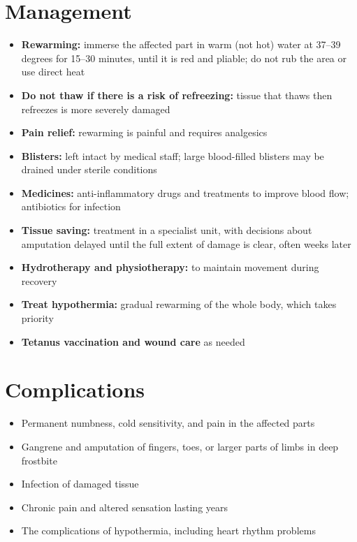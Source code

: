 \section*{Management}
\begin{itemize}
    \item \textbf{Rewarming:} immerse the affected part in warm (not hot) water at 37--39 degrees for 15--30 minutes, until it is red and pliable; do not rub the area or use direct heat
    \item \textbf{Do not thaw if there is a risk of refreezing:} tissue that thaws then refreezes is more severely damaged
    \item \textbf{Pain relief:} rewarming is painful and requires analgesics
    \item \textbf{Blisters:} left intact by medical staff; large blood-filled blisters may be drained under sterile conditions
    \item \textbf{Medicines:} anti-inflammatory drugs and treatments to improve blood flow; antibiotics for infection
    \item \textbf{Tissue saving:} treatment in a specialist unit, with decisions about amputation delayed until the full extent of damage is clear, often weeks later
    \item \textbf{Hydrotherapy and physiotherapy:} to maintain movement during recovery
    \item \textbf{Treat hypothermia:} gradual rewarming of the whole body, which takes priority
    \item \textbf{Tetanus vaccination and wound care} as needed
\end{itemize}

\section*{Complications}
\begin{itemize}
    \item Permanent numbness, cold sensitivity, and pain in the affected parts
    \item Gangrene and amputation of fingers, toes, or larger parts of limbs in deep frostbite
    \item Infection of damaged tissue
    \item Chronic pain and altered sensation lasting years
    \item The complications of hypothermia, including heart rhythm problems
\end{itemize}

